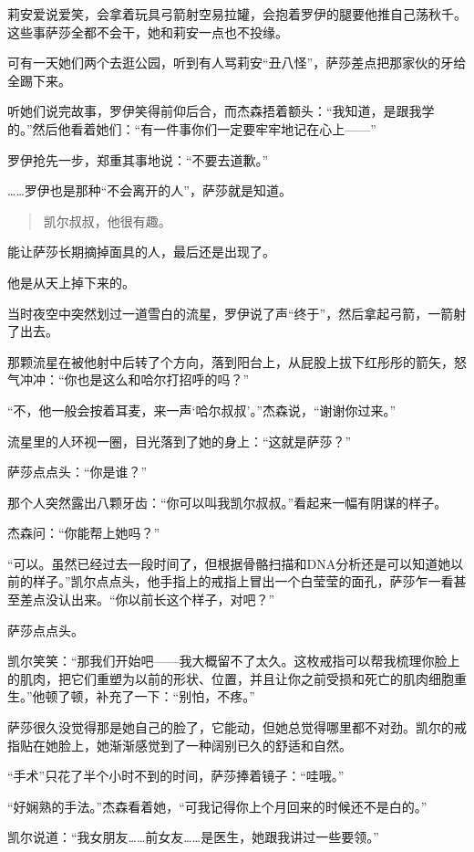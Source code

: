 \documentclass[../main]{subfiles}
\begin{document}
莉安爱说爱笑，会拿着玩具弓箭射空易拉罐，会抱着罗伊的腿要他推自己荡秋千。这些事萨莎全都不会干，她和莉安一点也不投缘。

可有一天她们两个去逛公园，听到有人骂莉安“丑八怪”，萨莎差点把那家伙的牙给全踢下来。

听她们说完故事，罗伊笑得前仰后合，而杰森捂着额头：“我知道，是跟我学的。”然后他看着她们：“有一件事你们一定要牢牢地记在心上——”

罗伊抢先一步，郑重其事地说：“不要去道歉。”

……罗伊也是那种“不会离开的人”，萨莎就是知道。

\begin{quote}
    凯尔叔叔，他很有趣。
\end{quote}

能让萨莎长期摘掉面具的人，最后还是出现了。

他是从天上掉下来的。

当时夜空中突然划过一道雪白的流星，罗伊说了声“终于”，然后拿起弓箭，一箭射了出去。

那颗流星在被他射中后转了个方向，落到阳台上，从屁股上拔下红彤彤的箭矢，怒气冲冲：“你也是这么和哈尔打招呼的吗？”

“不，他一般会按着耳麦，来一声`哈尔叔叔'。”杰森说，“谢谢你过来。”

流星里的人环视一圈，目光落到了她的身上：“这就是萨莎？”

萨莎点点头：“你是谁？”

那个人突然露出八颗牙齿：“你可以叫我凯尔叔叔。”看起来一幅有阴谋的样子。

杰森问：“你能帮上她吗？”

“可以。虽然已经过去一段时间了，但根据骨骼扫描和DNA分析还是可以知道她以前的样子。”凯尔点点头，他手指上的戒指上冒出一个白莹莹的面孔，萨莎乍一看甚至差点没认出来。“你以前长这个样子，对吧？”

萨莎点点头。

凯尔笑笑：“那我们开始吧——我大概留不了太久。这枚戒指可以帮我梳理你脸上的肌肉，把它们重塑为以前的形状、位置，并且让你之前受损和死亡的肌肉细胞重生。”他顿了顿，补充了一下：“别怕，不疼。”

萨莎很久没觉得那是她自己的脸了，它能动，但她总觉得哪里都不对劲。凯尔的戒指贴在她脸上，她渐渐感觉到了一种阔别已久的舒适和自然。

“手术”只花了半个小时不到的时间，萨莎捧着镜子：“哇哦。”

“好娴熟的手法。”杰森看着她，“可我记得你上个月回来的时候还不是白的。”

凯尔说道：“我女朋友……前女友……是医生，她跟我讲过一些要领。”
\end{document}

